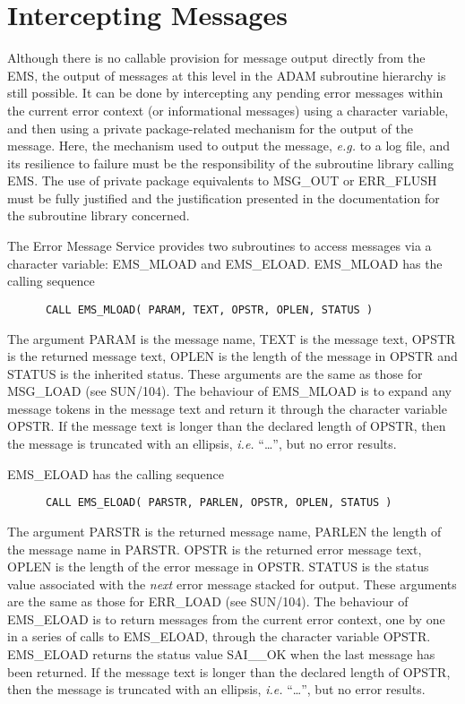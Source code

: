 \section {Intercepting Messages}

Although there is no callable provision for message output directly from the
EMS, the  output of messages at this level in the ADAM subroutine hierarchy is
still possible. 
It can be done by intercepting any pending error messages within the current
error context (or informational messages) using a character variable, and then 
using a private package-related mechanism for the output of the message. 
Here, the mechanism used to output the message, {\em e.g.} to a log file, and
its resilience to failure must be the responsibility of the subroutine library
calling EMS.
The use of private package equivalents to MSG\_OUT or ERR\_FLUSH must be fully
justified and the justification presented in the documentation for the
subroutine library concerned.

\begin {sloppypar}
The Error Message Service provides two subroutines to access messages via a
character variable: EMS\_MLOAD and EMS\_ELOAD.
EMS\_MLOAD has the calling sequence
\end {sloppypar}

\begin{verbatim}
      CALL EMS_MLOAD( PARAM, TEXT, OPSTR, OPLEN, STATUS )
\end{verbatim}

The argument PARAM is the message name, TEXT is the message text, OPSTR is the
returned message text, OPLEN is the
length of the message in OPSTR and STATUS is the inherited status. 
These arguments are the same as those for MSG\_LOAD (see SUN/104).
The behaviour of EMS\_MLOAD is to expand any message tokens in the message text
and return it through the character variable OPSTR.
If the message text is longer than the declared length of OPSTR, then the
message is truncated with an ellipsis, {\em i.e.} ``\ldots'', but no error 
results.

EMS\_ELOAD has the calling sequence

\begin{verbatim}
      CALL EMS_ELOAD( PARSTR, PARLEN, OPSTR, OPLEN, STATUS )
\end{verbatim}

The argument PARSTR is the returned message name, PARLEN the length of the
message name in PARSTR.
OPSTR is the returned error message text, OPLEN is the length of
the error message in OPSTR.
STATUS is the status value associated with the {\em next} error message stacked
for output.
These arguments are the same as those for ERR\_LOAD (see SUN/104).
The behaviour of EMS\_ELOAD is to return messages from the current error
context, one by one in a series of calls to EMS\_ELOAD, through the character
variable OPSTR. 
EMS\_ELOAD returns the status value SAI\_\_OK when the last message has been 
returned.
If the message text is longer than the declared length of OPSTR, then the
message is truncated with an ellipsis, {\em i.e.} ``\ldots'', but no error 
results.

